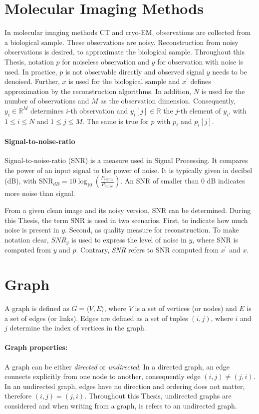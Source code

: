 \section{Molecular Imaging Methods}
In molecular imaging methods CT and cryo-EM, observations are collected from a biological sample. 
These observations are noisy. Reconstruction from noisy observations is desired, to approximate the biological sample.
Throughout this Thesis, notation $p$ for noiseless observation and $y$ for observation with noise is used.
In practice, $p$ is not observable directly and observed signal $y$ needs to be denoised.
Further, $x$ is used for the biological sample and $x^{\prime}$ defines approximation by the reconstruction algorithms.
In addition, $N$ is used for the number of observations and $M$ as the observation dimension.
Consequently, $y_i \in \mathbb{R}^M$ determines $i$-th observation and $y_i[j] \in \mathbb{R}$ the $j$-th element of $y_i$,
with $ 1 \leq i \leq N \text{ and } 1 \leq j \leq M$. The same is true for $p$ with $p_i$ and $p_i[j]$. 


\paragraph{Signal-to-noise-ratio}
Signal-to-noise-ratio (SNR) is a measure used in Signal Processing. 
It compares the power of an input signal to the power of noise. It is typically given in decibel (dB), with
$\text{SNR}_{dB} = 10 \log_{10} \left(  \frac{P_{signal}}{P_{noise}} \right)$.
An SNR of smaller than 0 dB indicates more noise than signal.

From a given clean image and its noisy version, SNR can be determined.
During this Thesis, the term SNR is used  in two scenarios.
First, to indicate how much noise is present in $y$. Second, as quality measure for reconstruction.
To make notation clear, $\textit{SNR}_y$ is used to express the level of noise in $y$, 
where SNR is computed from $y$ and $p$.
Contrary, \textit{SNR} refers to SNR computed from $x^{\prime}$ and $x$.

\section{Graph}
A graph is defined as $G = \langle V,E \rangle$, where $V$ is a set of 
vertices (or nodes) and $E$ is a set of edges (or links). 
Edges are defined as a set of tuples $(i, j)$, where $i$ and $j$ determine 
the index of vertices in the graph.

\paragraph{Graph properties:}
A graph can be either \textit{directed} or \textit{undirected}. 
In a directed graph, an edge connects explicitly from one node to another, consequently edge $(i, j) \neq (j, i)$. 
In an undirected graph, edges have no direction and ordering does not matter, therefore $(i, j) = (j, i)$.
Throughout this Thesis, undirected graphs are considered and when writing from a graph, is refers to an undirected graph.

